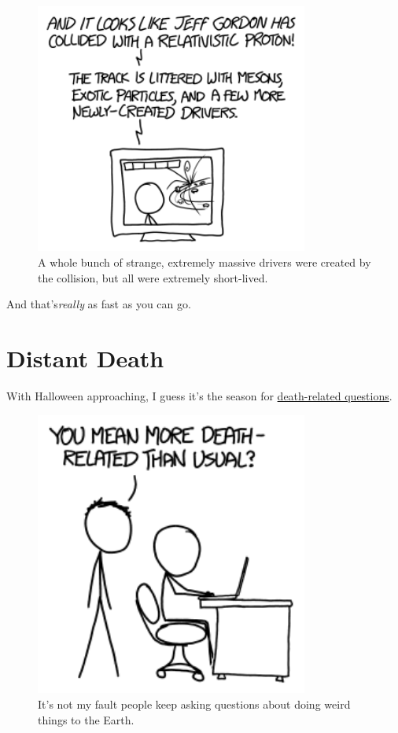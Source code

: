 {\begin{figure}[!htbp]
\centering
\includegraphics[scale=0.5, max width=0.8\textwidth]{imgs/a/116/particle.png}
\caption{A whole bunch of strange, extremely massive drivers were created by the collision, but all were extremely short-lived.}
\end{figure}

{And that's\emph{really} as fast as you can go.}

{
\chapter{Distant Death}
}

\hfill{}

{With Halloween approaching, I guess it's the season for \href{http://what-if.xkcd.com/69/}{death-related questions}.}

\begin{figure}[!htbp]
\centering
\includegraphics[scale=0.5, max width=0.8\textwidth]{imgs/a/117/usual.png}
\caption{It's not my fault people keep asking questions about doing weird things to the Earth.}
\end{figure}

}
